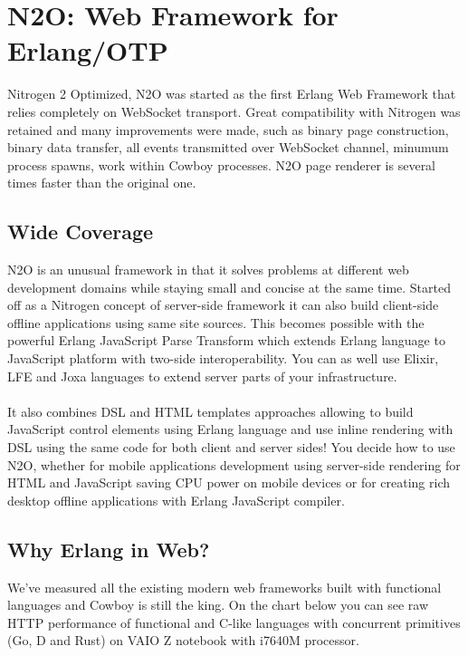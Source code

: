 \section{N2O: Web Framework for Erlang/OTP}
Nitrogen 2 Optimized, N2O was started as the first Erlang Web Framework
that relies completely on WebSocket transport. Great compatibility with Nitrogen
was retained and many improvements were made, such as binary page construction,
binary data transfer, all events transmitted over WebSocket channel, minumum process spawns,
work within Cowboy processes. N2O page renderer is several times faster
than the original one.

\subsection{Wide Coverage}
N2O is an unusual framework in that it solves problems at different web development domains
while staying small and concise at the same time. Started off as a Nitrogen concept
of server-side framework it can also build client-side offline applications
using same site sources. This becomes possible with the powerful Erlang JavaScript Parse
Transform which extends Erlang language to JavaScript platform with two-side
interoperability. You can as well use Elixir, LFE and Joxa languages to extend
server parts of your infrastructure.

\paragraph{}
It also combines DSL and HTML templates approaches allowing to build JavaScript
control elements using Erlang language and use inline rendering with DSL using
the same code for both client and server sides!
You decide how to use N2O, whether for mobile applications development using server-side rendering
for HTML and JavaScript saving CPU power on mobile devices or for creating rich desktop
offline applications with Erlang JavaScript compiler.

\newpage
\subsection*{Why Erlang in Web?}
We've measured all the existing modern web frameworks built with functional
languages and Cowboy is still the king. On the chart below you can see raw HTTP
performance of functional and C-like languages with concurrent
primitives (Go, D and Rust) on VAIO Z notebook with i7640M processor.

